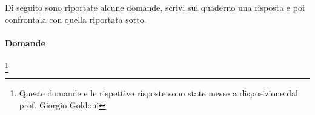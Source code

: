
\newpage %

\subsubsection*{}

Di seguito sono riportate alcune domande, scrivi sul quaderno una risposta 
e 
poi confrontala con quella riportata sotto.

\paragraph{Domande}
\footnote{Queste domande e le rispettive risposte sono state messe a 
disposizione dal prof. Giorgio Goldoni}
